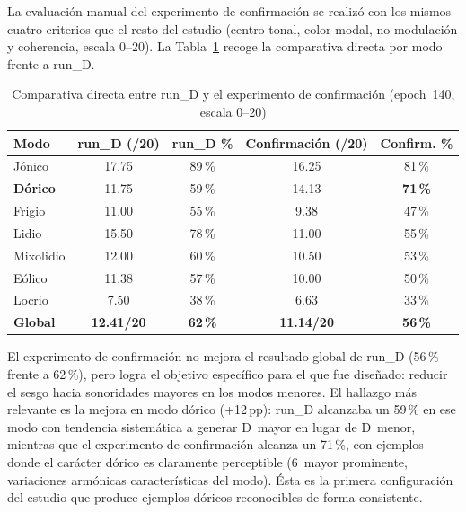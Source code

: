 \documentclass[%
    school=etsisi,%
    type=pfg,%
    degree=61CD,%
]{upm-report}
\begin{document}
La evaluaci\'on manual del experimento de confirmaci\'on se realiz\'o con los mismos cuatro criterios que el resto del estudio (centro tonal, color modal, no modulaci\'on y coherencia, escala 0--20). La Tabla~\ref{tab:confirm-comparativa} recoge la comparativa directa por modo frente a run\_D.

\begin{table}[H]
    \centering
    \caption{Comparativa directa entre run\_D y el experimento de confirmaci\'on (epoch~140, escala 0--20)}
    \label{tab:confirm-comparativa}
    \begin{tabular}{lcccc}
        \toprule
        \textbf{Modo} & \textbf{run\_D (/20)} & \textbf{run\_D \%} & \textbf{Confirmaci\'on (/20)} & \textbf{Confirm. \%} \\
        \midrule
        J\'onico              & 17.75 & 89\,\% & 16.25 & 81\,\% \\
        \textbf{D\'orico}     & 11.75 & 59\,\% & 14.13 & \textbf{71\,\%} \\
        Frigio                & 11.00 & 55\,\% &  9.38 & 47\,\% \\
        Lidio                 & 15.50 & 78\,\% & 11.00 & 55\,\% \\
        Mixolidio             & 12.00 & 60\,\% & 10.50 & 53\,\% \\
        E\'olico              & 11.38 & 57\,\% & 10.00 & 50\,\% \\
        Locrio                &  7.50 & 38\,\% &  6.63 & 33\,\% \\
        \midrule
        \textbf{Global} & \textbf{12.41/20} & \textbf{62\,\%} & \textbf{11.14/20} & \textbf{56\,\%} \\
        \bottomrule
    \end{tabular}
\end{table}

El experimento de confirmaci\'on no mejora el resultado global de run\_D (56\,\% frente a 62\,\%), pero logra el objetivo espec\'ifico para el que fue dise\~nado: reducir el sesgo hacia sonoridades mayores en los modos menores. El hallazgo m\'as relevante es la mejora en modo d\'orico (+12\,pp): run\_D alcanzaba un 59\,\% en ese modo con tendencia sistem\'atica a generar D~mayor en lugar de D~menor, mientras que el experimento de confirmaci\'on alcanza un 71\,\%, con ejemplos donde el car\'acter d\'orico es claramente perceptible (6\textordfeminine\ mayor prominente, variaciones arm\'onicas caracter\'isticas del modo). \'Esta es la primera configuraci\'on del estudio que produce ejemplos d\'oricos reconocibles de forma consistente.
\end{document}
